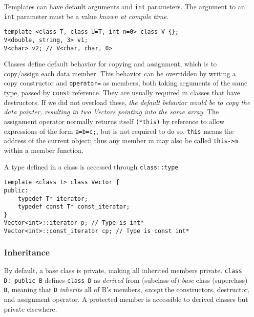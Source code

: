 		\newpage
		Templates can have default arguments and \lstinline!int! parameters. The argument to an \lstinline!int! parameter must be a value \emph{known at compile time}.
		\begin{code}\begin{lstlisting}[style=list]
template <class T, class U=T, int n=0> class V {};
V<double, string, 3> v1;
V<char> v2; // V<char, char, 0>
		\end{lstlisting}\end{code}
		
		Classes define default behavior for copying and assignment, which is to copy/assign each data member. This behavior can be overridden by writing a copy constructor and \lstinline!operator=! as members, both taking arguments of the same type, passed by \lstinline!const! reference. They are usually required in classes that have destructors. If we did not overload these, \emph{the default behavior would be to copy the data pointer, resulting in two Vectors pointing into the same array}. The assignment operator normally returns itself \lstinline!(*this)! by reference to allow expressions of the form \lstinline!a=b=c;!, but is not required to do so. \lstinline!this! means the address of the current object; thus any member m may also be called \lstinline!this->m! within a member function.
		
		A type defined in a class is accessed through \lstinline!class::type!
		\begin{code}\begin{lstlisting}[style=list]
template <class T> class Vector {
public:
	typedef T* iterator;
	typedef const T* const_iterator;
}
Vector<int>::iterator p; // Type is int*
Vector<int>::const_iterator cp; // Type is const int*
		\end{lstlisting}\end{code}
		
		\subsubsection{Inheritance} %
			
			By default, a base class is private, making all inherited members private. 
			\lstinline!class D: public B! defines \lstinline!class D! as \emph{derived} from (subclass of) \emph{base} class (superclass) \lstinline!B!, meaning that \lstinline!D! \emph{inherits} all of B's members, \emph{except} the constructors, destructor, and assignment operator. A protected member is accessible to derived classes but private elsewhere.
			
